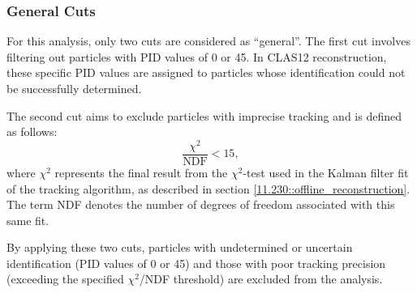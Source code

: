 \subsubsection{General Cuts}
\label{sssec::general_cuts}
    For this analysis, only two cuts are considered as ``general''.
    The first cut involves filtering out particles with PID values of 0 or 45.
    In CLAS12 reconstruction, these specific PID values are assigned to particles whose identification could not be successfully determined.

    The second cut aims to exclude particles with imprecise tracking and is defined as follows:
    \begin{equation*}
        \frac{\chi^2}{\text{NDF}} < 15,
    \end{equation*}
    where $\chi^2$ represents the final result from the $\chi^2$-test used in the Kalman filter fit of the tracking algorithm, as described in section \ref{11.230::offline_reconstruction}.
    The term NDF denotes the number of degrees of freedom associated with this same fit.

    By applying these two cuts, particles with undetermined or uncertain identification (PID values of 0 or 45) and those with poor tracking precision (exceeding the specified $\chi^2$/NDF threshold) are excluded from the analysis.
